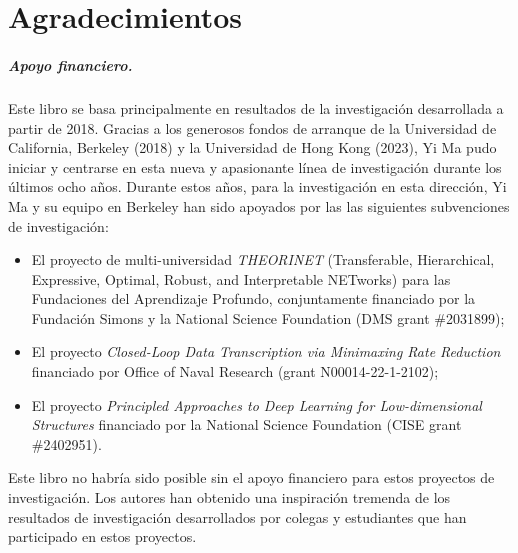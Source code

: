 \documentclass[../../book-main.tex]{subfiles}
\begin{document}
\chapter*{Agradecimientos}

\paragraph{Apoyo financiero.}
Este libro se basa principalmente en resultados de la investigación desarrollada
a partir de 2018. Gracias a los generosos fondos de arranque de la Universidad de California, Berkeley (2018) y la Universidad de Hong Kong (2023), Yi Ma pudo 
iniciar y centrarse en esta nueva y apasionante línea de investigación 
durante los últimos ocho años. Durante estos años, para
la investigación en esta dirección, Yi Ma y su equipo en Berkeley han sido 
apoyados por las las siguientes subvenciones de investigación:
\begin{itemize}
    \item El proyecto de multi-universidad {\em THEORINET} (Transferable, Hierarchical, 
        Expressive, Optimal, Robust, and Interpretable NETworks) para las
        Fundaciones del Aprendizaje Profundo, conjuntamente financiado por la 
        Fundación Simons y la National Science Foundation (DMS grant \#2031899);
    \item El proyecto {\em Closed-Loop Data Transcription via Minimaxing Rate
        Reduction} financiado por Office of Naval Research (grant
        N00014-22-1-2102);
    \item El proyecto {\em Principled Approaches to Deep Learning for
        Low-dimensional Structures} financiado por la National Science Foundation (CISE grant \#2402951).
\end{itemize}
Este libro no habría sido posible sin el apoyo financiero para estos
proyectos de investigación. Los autores han obtenido una inspiración tremenda de los
resultados de investigación desarrollados por colegas y estudiantes que han 
participado en estos proyectos.
\end{document}
